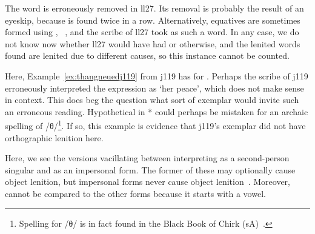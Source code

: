 \begin{mwl}
\end{mwl}
The word  is erroneously removed in \gls{ll27}. Its removal is probably the result of an eyeskip, because  is found twice in a row. Alternatively, equatives are sometimes formed using , \eg {}~\autocite[§~41]{evans_grammar_1964}, and the scribe of \gls{ll27} took  as such a word.  In any case, we do not know now whether \gls{ll27} would have had  or  otherwise, and the lenited words found are lenited due to different causes, so this instance cannot be counted.

\begin{mwl}
\end{mwl}
Here, Example~\ref{ex:thangneuedj119} from \gls{j119} has  for . Perhaps the scribe of \gls{j119} erroneously interpreted the expression as `her peace', which does not make sense in context. This does beg the question what sort of exemplar would invite such an erroneous reading. Hypothetical  in * could perhaps be mistaken for an archaic spelling of /θ/\footnote{Spelling  for /θ/ is in fact found in the Black Book of Chirk (\gls{sA})~\autocite[147]{Rus_Scribal95}.}. If so, this example is evidence that \gls{j119}'s exemplar did not have orthographic lenition here.

\begin{mwl}
\end{mwl}
Here, we see the versions vacillating between interpreting  as a second-person singular and as an impersonal form. The former of these may optionally cause object lenition, but impersonal forms never cause object lenition~\autocite[67]{van_development14}. Moreover,  cannot be compared to the other forms because it starts with a vowel.

